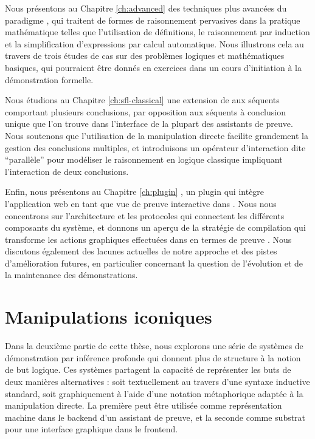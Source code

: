 
Nous présentons au Chapitre \ref{ch:advanced} des techniques plus avancées du paradigme , qui traitent de formes de raisonnement pervasives dans la pratique mathématique telles que l'utilisation de définitions, le raisonnement par induction et la simplification d'expressions par calcul automatique. Nous illustrons cela au travers de trois études de cas sur des problèmes logiques et mathématiques basiques, qui pourraient être donnés en exercices dans un cours d'initiation à la démonstration formelle.

Nous étudions au Chapitre \ref{ch:sfl-classical} une extension de  aux séquents comportant plusieurs conclusions, par opposition aux séquents à conclusion unique que l'on trouve dans l'interface de la plupart des assistants de preuve. Nous soutenons que l'utilisation de la manipulation directe facilite grandement la gestion des conclusions multiples, et introduisons un opérateur d'interaction dite ``parallèle'' pour modéliser le raisonnement en logique classique impliquant l'interaction de deux conclusions.

Enfin, nous présentons au Chapitre \ref{ch:plugin} , un plugin qui intègre l'application web  en tant que vue de preuve interactive dans . Nous nous concentrons sur l'architecture et les protocoles qui connectent les différents composants du système, et donnons un aperçu de la stratégie de compilation qui transforme les actions graphiques effectuées dans  en termes de preuve . Nous discutons également des lacunes actuelles de notre approche et des pistes d'amélioration futures, en particulier concernant la question de l'évolution et de la maintenance des démonstrations.

\section*{Manipulations iconiques}

Dans la deuxième partie de cette thèse, nous explorons une série de systèmes de démonstration par inférence profonde qui donnent plus de structure à la notion de but logique. Ces systèmes partagent la capacité de représenter les buts de deux manières alternatives : soit textuellement au travers d'une syntaxe inductive standard, soit graphiquement à l'aide d'une notation métaphorique adaptée à la manipulation directe. La première peut être utilisée comme représentation machine dans le backend d'un assistant de preuve, et la seconde comme substrat pour une interface graphique dans le frontend.

